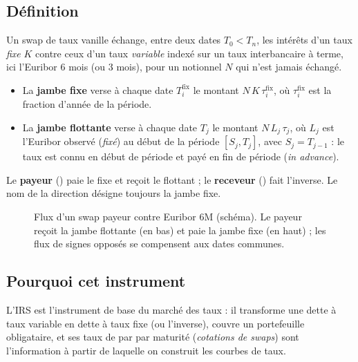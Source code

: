 \documentclass[11pt,a4paper]{article}
\newcommand{\code}[1]{\texttt{\detokenize{#1}}}
\theoremstyle{plain}
\theoremstyle{definition}
\theoremstyle{remark}
\begin{document}
\subsection{Définition}
Un swap de taux vanille échange, entre deux dates \(T_0 < T_n\), les intérêts d'un taux \emph{fixe}
\(K\) contre ceux d'un taux \emph{variable} indexé sur un taux interbancaire à terme, ici
l'Euribor 6 mois (ou 3 mois), pour un notionnel \(N\) qui n'est jamais échangé.
\begin{itemize}
  \item La \textbf{jambe fixe} verse à chaque date \(T_i^{\mathrm{fix}}\) le montant
    \(N\,K\,\tau_i^{\mathrm{fix}}\), où \(\tau_i^{\mathrm{fix}}\) est la fraction d'année de la période.
  \item La \textbf{jambe flottante} verse à chaque date \(T_j\) le montant \(N\,L_j\,\tau_j\), où
    \(L_j\) est l'Euribor observé (\emph{fixé}) au début de la période \([S_j,T_j]\), avec
    \(S_j = T_{j-1}\) : le taux est connu en début de période et payé en fin de période
    (\emph{in advance}).
\end{itemize}
Le \textbf{payeur} (\code{pay_fixed}) paie le fixe et reçoit le flottant ; le \textbf{receveur}
(\code{receive_fixed}) fait l'inverse. Le nom de la direction désigne toujours la jambe fixe.

\begin{figure}[H]
\centering
{}
\caption{Flux d'un swap payeur contre Euribor 6M (schéma). Le payeur reçoit la jambe flottante (en
bas) et paie la jambe fixe (en haut) ; les flux de signes opposés se compensent aux dates communes.}
\end{figure}

\subsection{Pourquoi cet instrument}
L'IRS est l'instrument de base du marché des taux : il transforme une dette à taux variable en dette à
taux fixe (ou l'inverse), couvre un portefeuille obligataire, et ses taux de par par maturité
(\emph{cotations de swaps}) sont l'information à partir de laquelle on construit les courbes de taux.
\end{document}
